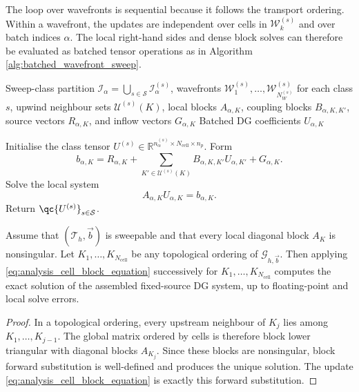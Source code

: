 \documentclass[final]{amsart}
\begin{document}
The loop over wavefronts is sequential because it follows the
transport ordering. Within a wavefront, the updates are independent
over cells in $\mathcal{W}^{(s)}_k$ and over batch indices
$\alpha$. The local right-hand sides and dense block solves can
therefore be evaluated as batched tensor operations as in Algorithm
\ref{alg:batched_wavefront_sweep}.

\begin{algorithm}[h!]
\caption{Batched tensor wavefront DG sweep by sweep class}
\label{alg:batched_wavefront_sweep}
\begin{algorithmic}[1]
\Require Sweep-class partition
$\mathcal{I}_\alpha=\bigcup_{s\in\mathcal{S}}\mathcal{I}_\alpha^{(s)}$,
wavefronts
$\mathcal{W}^{(s)}_1,\dots,\mathcal{W}^{(s)}_{N_W^{(s)}}$
for each class $s$, upwind neighbour sets $\mathcal{U}^{(s)}(K)$,
local blocks $A_{\alpha,K}$, coupling blocks $B_{\alpha,K,K'}$,
source vectors $R_{\alpha,K}$, and inflow vectors $G_{\alpha,K}$
\Ensure Batched DG coefficients $U_{\alpha,K}$

  \State Initialise the class tensor
  $U^{(s)}\in
  \mathbb{R}^{n_\alpha^{(s)}\times N_{\mathrm{cell}}\times n_p}$.
      \State Form
      \[
      b_{\alpha,K}
      =
      R_{\alpha,K}
      +
      \sum_{K'\in\mathcal U^{(s)}(K)}
      B_{\alpha,K,K'}U_{\alpha,K'}
      +
      G_{\alpha,K}.
      \]
      \State Solve the local system
      \[
      A_{\alpha,K}U_{\alpha,K}=b_{\alpha,K}.
      \]
    \EndFor
  \EndFor
\EndFor
\State Return $\qc{U^{(s)}}_{s\in\mathcal{S}}$.
\end{algorithmic}
\end{algorithm}

\begin{lemma}
\label{lem:analysis_topological_sweep_exactness}
Assume that $(\mathcal{T}_h,\vec b)$ is sweepable and that every local
diagonal block $A_K$ is nonsingular. Let
$K_1,\dots,K_{N_{\mathrm{cell}}}$ be any topological ordering of
$\mathcal{G}_{h,\vec b}$. Then applying
\eqref{eq:analysis_cell_block_equation} successively for
$K_1,\dots,K_{N_{\mathrm{cell}}}$ computes the exact solution of the
assembled fixed-source DG system, up to floating-point and local solve
errors.
\end{lemma}

\begin{proof}
In a topological ordering, every upstream neighbour of $K_j$ lies among
$K_1,\dots,K_{j-1}$. The global matrix ordered by cells is therefore
block lower triangular with diagonal blocks $A_{K_j}$. Since these
blocks are nonsingular, block forward substitution is well-defined and
produces the unique solution. The update
\eqref{eq:analysis_cell_block_equation} is exactly this forward
substitution.
\end{proof}
\end{document}
